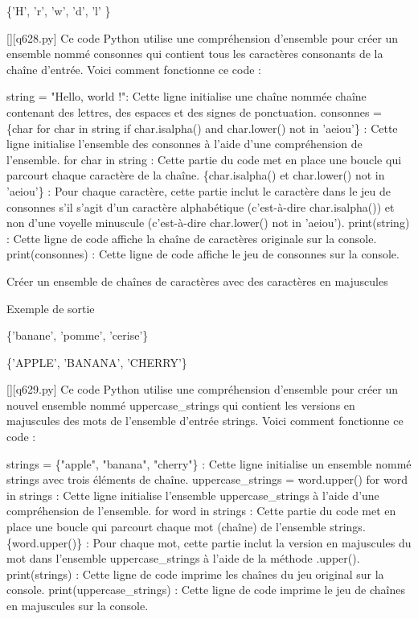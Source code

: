 \{'H', 'r', 'w', 'd', 'l' \}
        \par
        \begin{solution}
            \renewcommand{\nomfichier}{q628.py}
            \pythonfile{\chemincode \nomfichier}[][\nomfichier]
            Ce code Python utilise une compréhension d'ensemble pour créer un ensemble nommé consonnes qui contient tous les caractères consonants de la chaîne d'entrée. Voici comment fonctionne ce code :

    string = "Hello, world !": Cette ligne initialise une chaîne nommée chaîne contenant des lettres, des espaces et des signes de ponctuation.
    consonnes = \{char for char in string if char.isalpha() and char.lower() not in 'aeiou'\} : Cette ligne initialise l'ensemble des consonnes à l'aide d'une compréhension de l'ensemble.
        for char in string : Cette partie du code met en place une boucle qui parcourt chaque caractère de la chaîne.
        \{char.isalpha() et char.lower() not in 'aeiou'\} : Pour chaque caractère, cette partie inclut le caractère dans le jeu de consonnes s'il s'agit d'un caractère alphabétique (c'est-à-dire char.isalpha()) et non d'une voyelle minuscule (c'est-à-dire char.lower() not in 'aeiou').
    print(string) : Cette ligne de code affiche la chaîne de caractères originale sur la console.
    print(consonnes) : Cette ligne de code affiche le jeu de consonnes sur la console.
        \end{solution}
        

        \question
        Créer un ensemble de chaînes de caractères avec des caractères en majuscules

Exemple de sortie

\{'banane', 'pomme', 'cerise'\}

\{'APPLE', 'BANANA', 'CHERRY'\}
        \par
        \begin{solution}
            \renewcommand{\nomfichier}{q629.py}
            \pythonfile{\chemincode \nomfichier}[][\nomfichier]
            Ce code Python utilise une compréhension d'ensemble pour créer un nouvel ensemble nommé uppercase\_strings qui contient les versions en majuscules des mots de l'ensemble d'entrée strings. Voici comment fonctionne ce code :

    strings = \{"apple", "banana", "cherry"\} : Cette ligne initialise un ensemble nommé strings avec trois éléments de chaîne.
    uppercase\_strings = {word.upper() for word in strings} : Cette ligne initialise l'ensemble uppercase\_strings à l'aide d'une compréhension de l'ensemble.
        for word in strings : Cette partie du code met en place une boucle qui parcourt chaque mot (chaîne) de l'ensemble strings.
        \{word.upper()\} : Pour chaque mot, cette partie inclut la version en majuscules du mot dans l'ensemble uppercase\_strings à l'aide de la méthode .upper().
    print(strings) : Cette ligne de code imprime les chaînes du jeu original sur la console.
    print(uppercase\_strings) : Cette ligne de code imprime le jeu de chaînes en majuscules sur la console.
        \end{solution}
        


